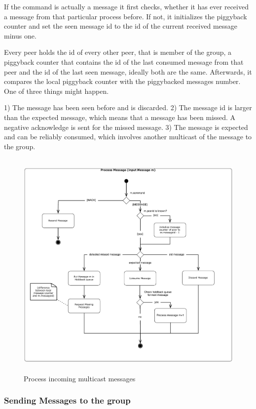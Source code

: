If the command is actually a message it first checks, whether it has ever received a message from that particular process before. If not, it initializes the piggyback counter and set the seen message id to the id of the current received message minus one.

Every peer holds the id of every other peer, that is member of the group, a piggyback counter that contains the id of the last consumed message from that peer and the id of the last seen message, ideally both are the same.
Afterwards, it compares the local piggyback counter with the piggybacked messages number. One of three things might happen. 

1) The message has been seen before and is discarded.
2) The message id is larger than the expected message, which means that a message has been missed. A negative acknowledge is sent for the missed message. 
3) The message is expected and can be reliably consumed, which involves another multicast of the message to the group.
 
\begin{figure}[htbp]
    \centering
        \includegraphics[height=4.5in]{figures/processMessages.pdf}
    \caption{Process incoming multicast messages}
    \label{fig:figures_processMessages}
\end{figure}

\subsubsection{Sending Messages to the group}

